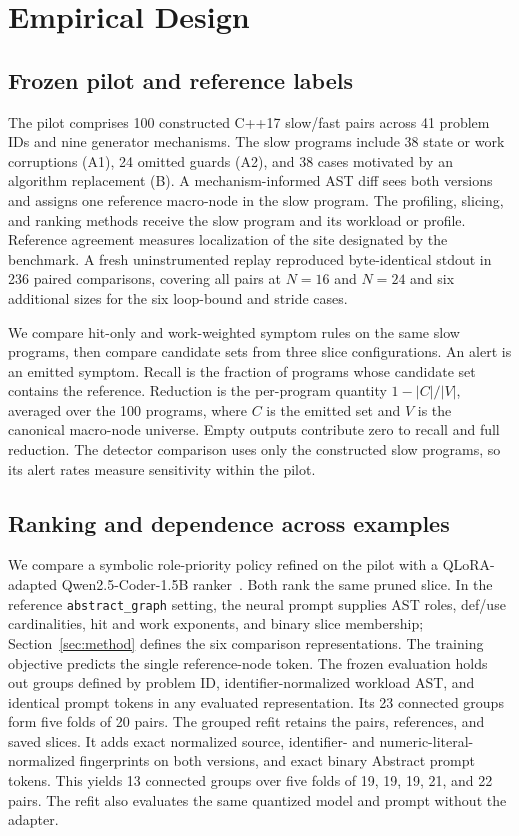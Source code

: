 \section{Empirical Design}
\label{sec:empirical-design}

\subsection{Frozen pilot and reference labels}

The pilot comprises 100 constructed C++17 slow/fast pairs across 41 problem IDs and nine generator mechanisms. The slow programs include 38 state or work corruptions (A1), 24 omitted guards (A2), and 38 cases motivated by an algorithm replacement (B). A mechanism-informed AST diff sees both versions and assigns one reference macro-node in the slow program. The profiling, slicing, and ranking methods receive the slow program and its workload or profile. Reference agreement measures localization of the site designated by the benchmark. A fresh uninstrumented replay reproduced byte-identical stdout in 236 paired comparisons, covering all pairs at $N=16$ and $N=24$ and six additional sizes for the six loop-bound and stride cases.

We compare hit-only and work-weighted symptom rules on the same slow programs, then compare candidate sets from three slice configurations. An alert is an emitted symptom. Recall is the fraction of programs whose candidate set contains the reference. Reduction is the per-program quantity $1-|C|/|V|$, averaged over the 100 programs, where $C$ is the emitted set and $V$ is the canonical macro-node universe. Empty outputs contribute zero to recall and full reduction. The detector comparison uses only the constructed slow programs, so its alert rates measure sensitivity within the pilot.

\subsection{Ranking and dependence across examples}

We compare a symbolic role-priority policy refined on the pilot with a QLoRA-adapted Qwen2.5-Coder-1.5B ranker~\cite{dettmers2023qlora,hui2024qwen}. Both rank the same pruned slice. In the reference \nolinkurl{abstract_graph} setting, the neural prompt supplies AST roles, def/use cardinalities, hit and work exponents, and binary slice membership; Section~\ref{sec:method} defines the six comparison representations. The training objective predicts the single reference-node token. The frozen evaluation holds out groups defined by problem ID, identifier-normalized workload AST, and identical prompt tokens in any evaluated representation. Its 23 connected groups form five folds of 20 pairs. The grouped refit retains the pairs, references, and saved slices. It adds exact normalized source, identifier- and numeric-literal-normalized fingerprints on both versions, and exact binary Abstract prompt tokens. This yields 13 connected groups over five folds of 19, 19, 19, 21, and 22 pairs. The refit also evaluates the same quantized model and prompt without the adapter.

